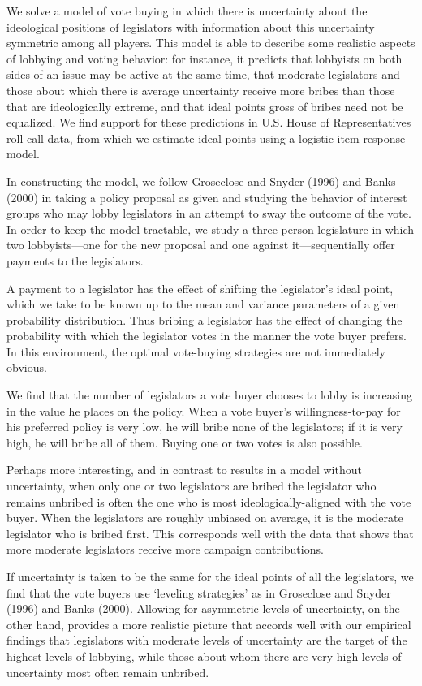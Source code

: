 \documentclass[12pt]{article}
\begin{document}
We solve a model of vote buying in which there is uncertainty about the ideological positions of legislators with information about this uncertainty symmetric among all players. This model is able to describe some realistic aspects of lobbying and voting behavior: for instance, it predicts that lobbyists on both sides of an issue may be active at the same time, that moderate legislators and those about which there is average uncertainty receive more bribes than those that are ideologically extreme, and that ideal points gross of bribes need not be equalized. We find support for these predictions in U.S. House of Representatives roll call data, from which we estimate ideal points using a logistic item response model.

In constructing the model, we follow Groseclose and Snyder (1996) and Banks (2000) in taking a policy proposal as given and studying the behavior of interest groups who may lobby legislators in an attempt to sway the outcome of the vote. In order to keep the model tractable, we study a three-person legislature in which two lobbyists---one for the new proposal and one against it---sequentially offer payments to the legislators.

A payment to a legislator has the effect of shifting the legislator's ideal point, which we take to be known up to the mean and variance parameters of a given probability distribution. Thus bribing a legislator has the effect of changing the probability with which the legislator votes in the manner the vote buyer prefers. In this environment, the optimal vote-buying strategies are not immediately obvious.

We find that the number of legislators a vote buyer chooses to lobby is increasing in the value he places on the policy. When a vote buyer's willingness-to-pay for his preferred policy is very low, he will bribe none of the legislators; if it is very high, he will bribe all of them. Buying one or two votes is also possible.

Perhaps more interesting, and in contrast to results in a model without uncertainty, when only one or two legislators are bribed the legislator who remains unbribed is often the one who is most ideologically-aligned with the vote buyer. When the legislators are roughly unbiased on average, it is the moderate legislator who is bribed first. This corresponds well with the data that shows that more moderate legislators receive more campaign contributions.

If uncertainty is taken to be the same for the ideal points of all the legislators, we find that the vote buyers use `leveling strategies' as in Groseclose and Snyder (1996) and Banks (2000). Allowing for asymmetric levels of uncertainty, on the other hand, provides a more realistic picture that accords well with our empirical findings that legislators with moderate levels of uncertainty are the target of the highest levels of lobbying, while those about whom there are very high levels of uncertainty most often remain unbribed.
\end{document}
